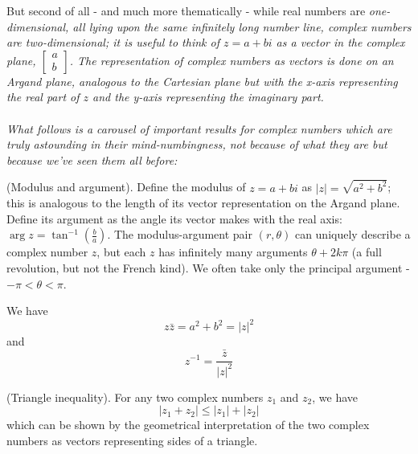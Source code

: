 \documentclass{article}
\begin{document}
But second of all - and much more thematically - while real numbers are \it one-dimensional, \normalfont all lying upon the same infinitely long number line, complex numbers are two-dimensional; it is useful to think of $z=a+bi$ as a vector in the \it complex plane, \normalfont  $\begin{bmatrix}
    a\\b
\end{bmatrix}$. The representation of complex numbers as vectors is done on an \it Argand plane\normalfont , analogous to the Cartesian plane but with the x-axis representing the real part of $z$ and the y-axis representing the imaginary part. \\ \\
What follows is a carousel of important results for complex numbers which are truly astounding in their mind-numbingness, not because of what they are but because we've seen them all before:
\begin{definition}
    (Modulus and argument). Define the modulus of $z=a+bi$ as $|z|=\sqrt{a^2+b^2}$; this is analogous to the length of its vector representation on the Argand plane. Define its argument as the angle its vector makes with the real axis: $\arg z = \tan^{-1}(\frac{b}{a})$. The modulus-argument pair $(r,\theta)$ can uniquely describe a complex number $z$, but each $z$ has infinitely many arguments $\theta+2k\pi$ (a full revolution, but not the French kind). We often take only the principal argument - $-\pi<\theta<\pi$.
\end{definition}
\begin{proposition}
    We have 
    \begin{equation*}
        z\bar{z}=a^2+b^2 = |z|^2
    \end{equation*}
    and
    \begin{equation*}
        z^{-1}=\frac{\bar{z}}{|z|^2}
    \end{equation*}
\end{proposition}
\begin{theorem}
    (Triangle inequality). For any two complex numbers $z_1$ and $z_2$, we have 
    \begin{equation*}
        |z_1+z_2|\leq |z_1|+|z_2|
    \end{equation*}
    which can be shown by the geometrical interpretation of the two complex numbers as vectors representing sides of a triangle.
\end{theorem}
\end{document}
